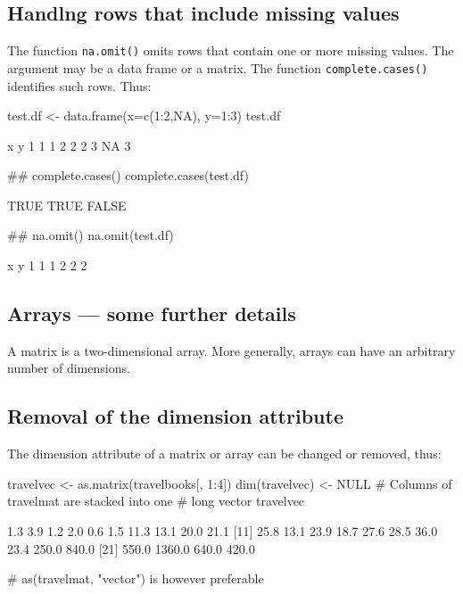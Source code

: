 \documentclass{tufte-book}\usepackage[]{graphicx}\usepackage[]{color}
\newcommand{\txtt}[1]{\texttt{#1}}
\begin{document}
\subsection{Handlng rows that include missing values}
The function \txtt{na.omit()} omits rows that contain one
or more missing values. The argument may be a data frame or a
matrix. The function \txtt{complete.cases()} identifies
such rows. Thus:
\begin{Schunk}
\begin{Sinput}
test.df <- data.frame(x=c(1:2,NA), y=1:3)
test.df
\end{Sinput}
\begin{Soutput}
   x y
1  1 1
2  2 2
3 NA 3
\end{Soutput}
\begin{Sinput}
## complete.cases()
complete.cases(test.df)
\end{Sinput}
\begin{Soutput}
[1]  TRUE  TRUE FALSE
\end{Soutput}
\begin{Sinput}
## na.omit()
na.omit(test.df)
\end{Sinput}
\begin{Soutput}
  x y
1 1 1
2 2 2
\end{Soutput}
\end{Schunk}

\subsection{Arrays --- some further details}

A matrix is a two-dimensional array.  More generally, arrays can
have an arbitrary number of dimensions.

\subsection*{Removal of the dimension attribute}

The dimension attribute of a matrix or array can be changed or
removed, thus:
\begin{fullwidth}

\begin{Schunk}
\begin{Sinput}
travelvec <-  as.matrix(travelbooks[, 1:4])
dim(travelvec) <- NULL  # Columns of travelmat are stacked into one
                        # long vector
travelvec
\end{Sinput}
\begin{Soutput}
 [1]    1.3    3.9    1.2    2.0    0.6    1.5   11.3   13.1   20.0   21.1
[11]   25.8   13.1   23.9   18.7   27.6   28.5   36.0   23.4  250.0  840.0
[21]  550.0 1360.0  640.0  420.0
\end{Soutput}
\begin{Sinput}
  # as(travelmat, "vector") is however preferable
\end{Sinput}
\end{Schunk}

\end{fullwidth}
\end{document}
